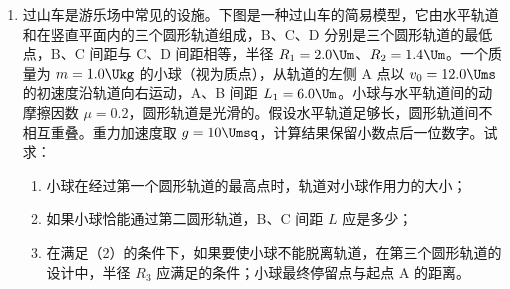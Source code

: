 \documentclass[\gkver]{gaokaozhenti}
\begin{document}
\begin{enumerate}
{（2）设微粒 1 到达（0，$-d$）点时的速度为 $v$，则电场力做功的瞬时功率为 $P=qEv_{B}\cos\theta=qEv_{Bx}$，其中由运动学公式 $v_{Bx}=-\sqrt{-2ad}=-\sqrt{\frac{-2qEd}{m}}$，所以 $P=qE\sqrt{\frac{-2qEd}{m}}$。

（3）两微粒的运动具有对称性，如图所示，当微粒 1 到达（0，$-d$）点时发生的位移 $S_{1}=\sqrt{2}d$，则当微粒 1 到达（0，$-d$）点时，两微粒间的距离为 $BC=2S_{1}=2\sqrt{2}d$。

}

\item
过山车是游乐场中常见的设施。下图是一种过山车的简易模型，它由水平轨道和在竖直平面内的三个圆形轨道组成，B、C、D 分别是三个圆形轨道的最低点，B、C 间距与 C、D 间距相等，半径 $R_{1}=2.0\Um$、$R_{2}=1.4\Um$。一个质量为 $m=1.0\Ukg$ 的小球（视为质点），从轨道的左侧 A 点以 $v_{0}=12.0\Ums$ 的初速度沿轨道向右运动，A、B 间距 $L_{1}=6.0\Um$。小球与水平轨道间的动摩擦因数 $\mu=0.2$，圆形轨道是光滑的。假设水平轨道足够长，圆形轨道间不相互重叠。重力加速度取 $g=10\Umsq$，计算结果保留小数点后一位数字。试求：

\begin{enumerate}
	\item
	小球在经过第一个圆形轨道的最高点时，轨道对小球作用力的大小；
	\item
	如果小球恰能通过第二圆形轨道，B、C 间距 $L$ 应是多少；
	\item
	在满足（2）的条件下，如果要使小球不能脱离轨道，在第三个圆形轨道的设计中，半径 $R_{3}$ 应满足的条件；小球最终停留点与起点 A 的距离。
\end{enumerate}


\end{enumerate}
\end{document}
